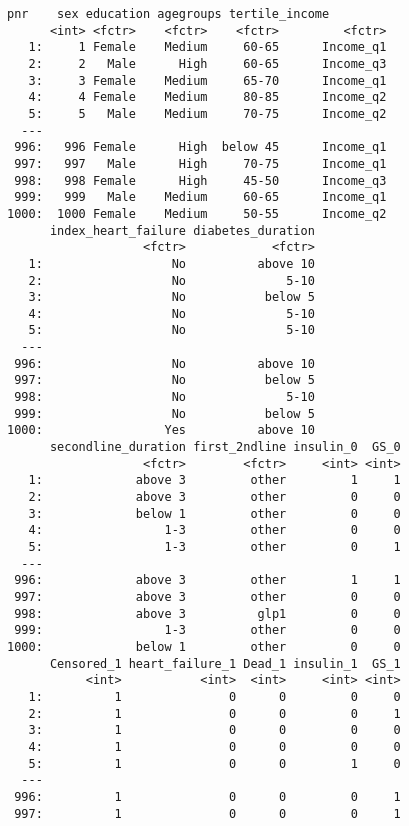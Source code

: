 \documentclass[11pt]{article}
\begin{document}
\begin{verbatim}
pnr    sex education agegroups tertile_income
      <int> <fctr>    <fctr>    <fctr>         <fctr>
   1:     1 Female    Medium     60-65      Income_q1
   2:     2   Male      High     60-65      Income_q3
   3:     3 Female    Medium     65-70      Income_q1
   4:     4 Female    Medium     80-85      Income_q2
   5:     5   Male    Medium     70-75      Income_q2
  ---                                                
 996:   996 Female      High  below 45      Income_q1
 997:   997   Male      High     70-75      Income_q1
 998:   998 Female      High     45-50      Income_q3
 999:   999   Male    Medium     60-65      Income_q1
1000:  1000 Female    Medium     50-55      Income_q2
      index_heart_failure diabetes_duration
                   <fctr>            <fctr>
   1:                  No          above 10
   2:                  No              5-10
   3:                  No           below 5
   4:                  No              5-10
   5:                  No              5-10
  ---                                      
 996:                  No          above 10
 997:                  No           below 5
 998:                  No              5-10
 999:                  No           below 5
1000:                 Yes          above 10
      secondline_duration first_2ndline insulin_0  GS_0
                   <fctr>        <fctr>     <int> <int>
   1:             above 3         other         1     1
   2:             above 3         other         0     0
   3:             below 1         other         0     0
   4:                 1-3         other         0     0
   5:                 1-3         other         0     1
  ---                                                  
 996:             above 3         other         1     1
 997:             above 3         other         0     0
 998:             above 3          glp1         0     0
 999:                 1-3         other         0     0
1000:             below 1         other         0     0
      Censored_1 heart_failure_1 Dead_1 insulin_1  GS_1
           <int>           <int>  <int>     <int> <int>
   1:          1               0      0         0     0
   2:          1               0      0         0     1
   3:          1               0      0         0     0
   4:          1               0      0         0     0
   5:          1               0      0         1     0
  ---                                                  
 996:          1               0      0         0     1
 997:          1               0      0         0     1

\end{verbatim}
\end{document}
